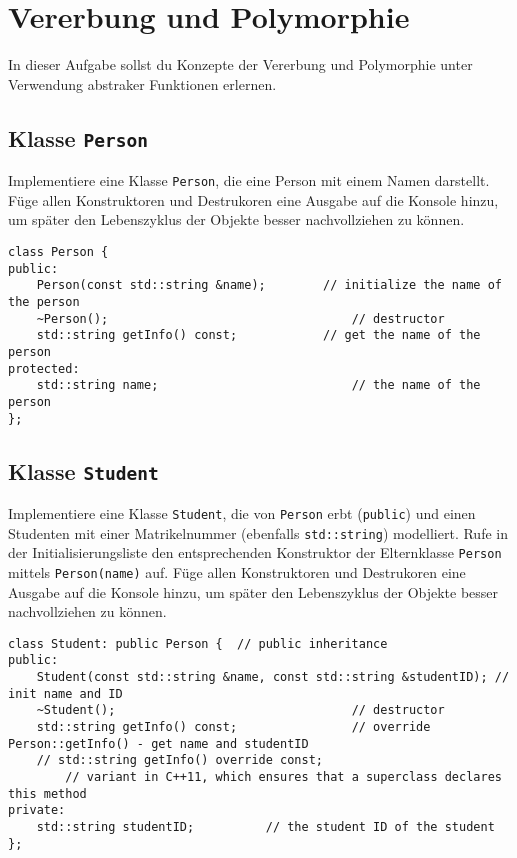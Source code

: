 \section{Vererbung und Polymorphie}\label{sec:inheritance}
In dieser Aufgabe sollst du Konzepte der Vererbung und Polymorphie unter Verwendung abstraker Funktionen erlernen.

\subsection{Klasse \texttt{Person}}
Implementiere eine Klasse \texttt{Person}, die eine Person mit einem Namen darstellt.
Füge allen Konstruktoren und Destrukoren eine Ausgabe auf die Konsole hinzu, um später den Lebenszyklus der Objekte besser nachvollziehen zu können.

\begin{lstlisting}
class Person {
public:
	Person(const std::string &name);		// initialize the name of the person
	~Person();									// destructor
	std::string getInfo() const;			// get the name of the person
protected:
	std::string name;							// the name of the person
};
\end{lstlisting}


\subsection{Klasse \texttt{Student}}
Implementiere eine Klasse \texttt{Student}, die von \texttt{Person} erbt (\texttt{public}) und einen Studenten mit einer Matrikelnummer (ebenfalls \texttt{std::string}) modelliert.
Rufe in der Initialisierungsliste den entsprechenden Konstruktor der Elternklasse \texttt{Person} mittels \texttt{Person(name)} auf.
Füge allen Konstruktoren und Destrukoren eine Ausgabe auf die Konsole hinzu, um später den Lebenszyklus der Objekte besser nachvollziehen zu können.

\begin{lstlisting}
class Student: public Person {	// public inheritance
public:
	Student(const std::string &name, const std::string &studentID); // init name and ID
	~Student();									// destructor
	std::string getInfo() const;				// override Person::getInfo() - get name and studentID
    // std::string getInfo() override const;	
        // variant in C++11, which ensures that a superclass declares this method
private:
	std::string studentID;			// the student ID of the student
};
\end{lstlisting}

